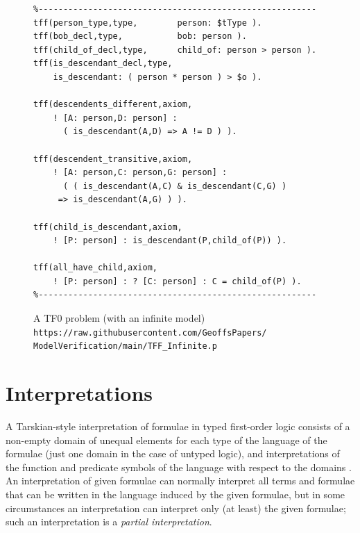\documentclass[letterpaper]{article}
\begin{document}
\begin{figure}[htbp]
\scriptsize
{}
\begin{verbatim}
%--------------------------------------------------------
tff(person_type,type,        person: $tType ).
tff(bob_decl,type,           bob: person ).
tff(child_of_decl,type,      child_of: person > person ).
tff(is_descendant_decl,type, 
    is_descendant: ( person * person ) > $o ).

tff(descendents_different,axiom,
    ! [A: person,D: person] : 
      ( is_descendant(A,D) => A != D ) ).

tff(descendent_transitive,axiom,
    ! [A: person,C: person,G: person] :
      ( ( is_descendant(A,C) & is_descendant(C,G) ) 
     => is_descendant(A,G) ) ).

tff(child_is_descendant,axiom,
    ! [P: person] : is_descendant(P,child_of(P)) ).

tff(all_have_child,axiom,
    ! [P: person] : ? [C: person] : C = child_of(P) ).
%--------------------------------------------------------
\end{verbatim}
\caption{A TF0 problem (with an infinite model)\\
{\scriptsize {\tt https://raw.githubusercontent.com/GeoffsPapers/\\
ModelVerification/main/TFF\_Infinite.p}}}
\label{TF0InfiniteProblem}
\end{figure}


\section{Interpretations}
\label{Interpretations}

A Tarskian-style \cite{TV56} interpretation of formulae in typed first-order logic 
consists of a non-empty domain of unequal elements for each type of the language of the formulae 
(just one domain in the case of untyped logic), and interpretations of the function and predicate 
symbols of the language with respect to the domains \cite{Hun96}.
An interpretation of given formulae can normally interpret all terms and formulae that can be 
written in the language induced by the given formulae, but in some circumstances an interpretation 
can interpret only (at least) the given formulae; such an interpretation is a {\em partial
interpretation}.
\end{document}
